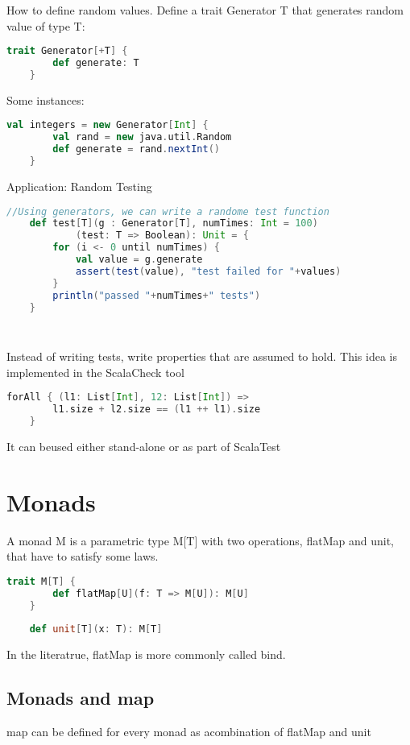 \documentclass[10pt, a4paper]{report}
\begin{document}
How to define random values. Define a trait Generator T that generates random value of type T:

\begin{lstlisting}[language=scala]
	trait Generator[+T] {
		def generate: T
	}
\end{lstlisting}

Some instances:

\begin{lstlisting}[language=scala]
	val integers = new Generator[Int] {
		val rand = new java.util.Random
		def generate = rand.nextInt()
	}
\end{lstlisting}

Application: Random Testing

\begin{lstlisting}[language=scala]
	//Using generators, we can write a randome test function
	def test[T](g : Generator[T], numTimes: Int = 100)
			(test: T => Boolean): Unit = {
		for (i <- 0 until numTimes) {
			val value = g.generate
			assert(test(value), "test failed for "+values)
		}
		println("passed "+numTimes+" tests")
	}	
	
	
\end{lstlisting}

Instead of writing tests, write properties that are assumed to hold. This idea is implemented in the ScalaCheck tool

\begin{lstlisting}[language=scala]
	forAll { (l1: List[Int], 12: List[Int]) =>
		l1.size + l2.size == (l1 ++ l1).size
	}
\end{lstlisting}

It can beused either stand-alone or as part of ScalaTest

\section{Monads}

A monad M is a parametric type M[T] with two operations, flatMap and unit, that have to satisfy some laws.

\begin{lstlisting}[language=scala]
	trait M[T] {
		def flatMap[U](f: T => M[U]): M[U]
	}
	
	def unit[T](x: T): M[T]
\end{lstlisting}

In the literatrue, flatMap is more commonly called bind.\\

\subsection{Monads and map}
 map can be defined for every monad as acombination of flatMap and unit
\end{document}
